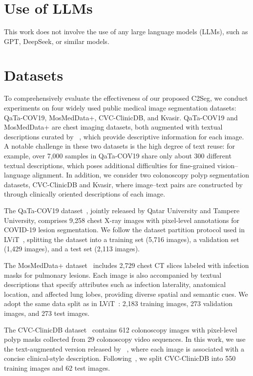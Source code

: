 \documentclass{article} %
\begin{document}
\section{Use of LLMs}
This work does not involve the use of any large language models (LLMs), such as GPT, DeepSeek, or similar models.

\section{Datasets}
\label{sec:Datasets}

To comprehensively evaluate the effectiveness of our proposed C2Seg, we conduct experiments on four widely used public medical image segmentation datasets: QaTa-COV19, MosMedData+, CVC-ClinicDB, and Kvasir. QaTa-COV19 and MosMedData+ are chest imaging datasets, both augmented with textual descriptions curated by ~\cite{li2023lvit}, which provide descriptive information for each image. A notable challenge in these two datasets is the high degree of text reuse: for example, over 7{,}000 samples in QaTa-COV19 share only about 300 different textual descriptions, which poses additional difficulties for fine-grained vision--language alignment. In addition, we consider two colonoscopy polyp segmentation datasets, CVC-ClinicDB and Kvasir, where image--text pairs are constructed by ~\cite{zhang2024madapter} through clinically oriented descriptions of each image.

The QaTa-COV19 dataset~\cite{degerli2022osegnet}, jointly released by Qatar University and Tampere University, comprises 9{,}258 chest X-ray images with pixel-level annotations for COVID-19 lesion segmentation. We follow the dataset partition protocol used in LViT~\cite{li2023lvit}, splitting the dataset into a training set (5{,}716 images), a validation set (1{,}429 images), and a test set (2{,}113 images).

The MosMedData+ dataset~\cite{morozov2020mosmeddata,hofmanninger2020automatic} includes 2{,}729 chest CT slices labeled with infection masks for pulmonary lesions. Each image is also accompanied by textual descriptions that specify attributes such as infection laterality, anatomical location, and affected lung lobes, providing diverse spatial and semantic cues. We adopt the same data split as in LViT~\cite{li2023lvit}: 2{,}183 training images, 273 validation images, and 273 test images.

The CVC-ClinicDB dataset~\cite{bernal2015wm} contains 612 colonoscopy images with pixel-level polyp masks collected from 29 colonoscopy video sequences. In this work, we use the text-augmented version released by ~\cite{zhang2024madapter}, where each image is associated with a concise clinical-style description. Following~\cite{zhang2024madapter}, we split CVC-ClinicDB into 550 training images and 62 test images.
\end{document}
